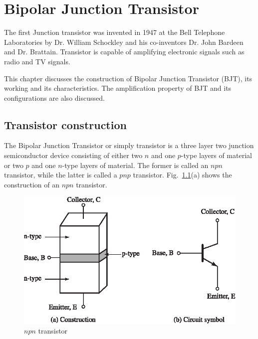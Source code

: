 \chapter{Bipolar Junction Transistor}\label{chap3}

The first Junction transistor was invented in 1947 at the Bell Telephone Laboratories by Dr. William Schockley and his co-inventors Dr. John Bardeen and Dr. Brattain. Transistor is capable of amplifying electronic signals such as radio and TV signals.

This chapter discusses the construction of Bipolar Junction Transistor (BJT), its working and its characteristics. The amplification property of BJT and its configurations are also discussed.

\section{Transistor construction}\label{sec3.1}

The Bipolar Junction Transistor or simply transistor is a three layer two junction semiconductor device consisting of either two $n$ and one $p$-type layers of material or two $p$ and one $n$-type layers of material. The former is called an $npn$ transistor, while the latter is called a $pnp$ transistor.
Fig.~\ref{fig3.1}(a) shows the construction of an $npn$ transistor.
\begin{figure}[H]
\centering
\includegraphics[scale=.93]{chap2/S3-EE-03-001.eps}
\caption{$npn$ transistor}\label{fig3.1}
\end{figure}


